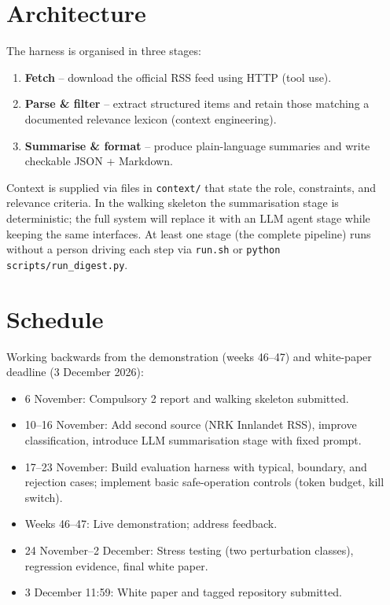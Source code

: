\documentclass{article}
\begin{document}
\section{Architecture}
The harness is organised in three stages:
\begin{enumerate}
  \item \textbf{Fetch} -- download the official RSS feed using HTTP (tool use).
  \item \textbf{Parse \& filter} -- extract structured items and retain those matching a documented relevance lexicon (context engineering).
  \item \textbf{Summarise \& format} -- produce plain-language summaries and write checkable JSON + Markdown.
\end{enumerate}
Context is supplied via files in \texttt{context/} that state the role, constraints, and relevance criteria. In the walking skeleton the summarisation stage is deterministic; the full system will replace it with an LLM agent stage while keeping the same interfaces. At least one stage (the complete pipeline) runs without a person driving each step via \texttt{run.sh} or \texttt{python scripts/run\_digest.py}.

\section{Schedule}
Working backwards from the demonstration (weeks 46--47) and white-paper deadline (3 December 2026):
\begin{itemize}
  \item 6 November: Compulsory 2 report and walking skeleton submitted.
  \item 10--16 November: Add second source (NRK Innlandet RSS), improve classification, introduce LLM summarisation stage with fixed prompt.
  \item 17--23 November: Build evaluation harness with typical, boundary, and rejection cases; implement basic safe-operation controls (token budget, kill switch).
  \item Weeks 46--47: Live demonstration; address feedback.
  \item 24 November--2 December: Stress testing (two perturbation classes), regression evidence, final white paper.
  \item 3 December 11:59: White paper and tagged repository submitted.
\end{itemize}
\end{document}
